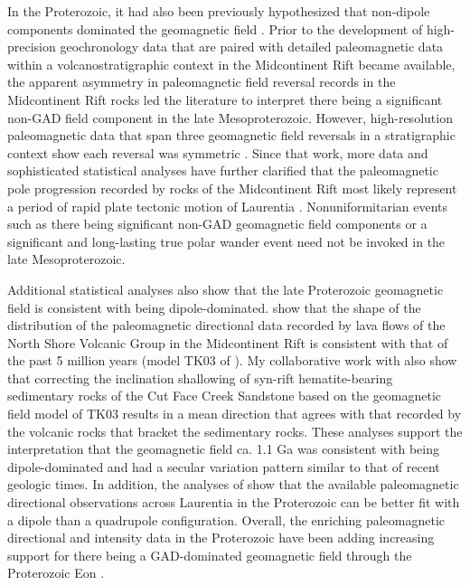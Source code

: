 In the Proterozoic, it had also been previously hypothesized that non-dipole components dominated the geomagnetic field \citep[e.g.][]{Pesonen1981a, Sears2022a}. Prior to the development of high-precision geochronology data that are paired with detailed paleomagnetic data within a volcanostratigraphic context in the Midcontinent Rift became available, the apparent asymmetry in paleomagnetic field reversal records in the Midcontinent Rift rocks led the literature \citep[e.g.][]{Halls1982a, Pesonen1981a} to interpret there being a significant non-GAD field component in the late Mesoproterozoic. However, high-resolution paleomagnetic data that span three geomagnetic field reversals in a stratigraphic context show each reversal was symmetric \citep{Swanson-Hysell2009a}. Since that work, more data and sophisticated statistical analyses have further clarified that the paleomagnetic pole progression recorded by rocks of the Midcontinent Rift most likely represent a period of rapid plate tectonic motion of Laurentia \citep{Swanson-Hysell2019a, Rose2022a}. Nonuniformitarian events such as there being significant non-GAD geomagnetic field components or a significant and long-lasting true polar wander event need not be invoked 
in the late Mesoproterozoic. 

Additional statistical analyses also show that the late Proterozoic geomagnetic field is consistent with being dipole-dominated. \cite{Tauxe2009a} show that the shape of the distribution of the paleomagnetic directional data recorded by lava flows of the North Shore Volcanic Group in the Midcontinent Rift is consistent with that of the past 5 million years (model TK03 of \citealp{Tauxe2004b}). My collaborative work with \cite{Pierce2022a} also show that correcting the inclination shallowing of syn-rift hematite-bearing sedimentary rocks of the Cut Face Creek Sandstone based on the geomagnetic field model of TK03 results in a mean direction that agrees with that recorded by the volcanic rocks that bracket the sedimentary rocks. These analyses support the interpretation that the geomagnetic field ca. 1.1 Ga was consistent with being dipole-dominated and had a secular variation pattern similar to that of recent geologic times. In addition, the analyses of \cite{Gong2023a} show that the available paleomagnetic directional observations across Laurentia in the Proterozoic can be better fit with a dipole than a quadrupole configuration. Overall, the enriching paleomagnetic directional and intensity data in the Proterozoic have been adding increasing support for there being a GAD-dominated geomagnetic field through the Proterozoic Eon \citep{Veikkolainen2014a, Salminen2017a, Veikkolainen2021a}. 

